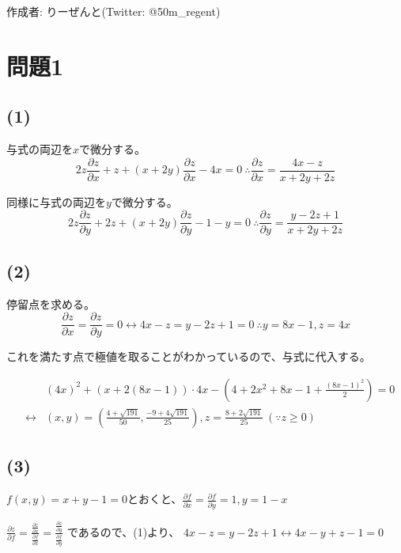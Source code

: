 \documentclass[]{jsarticle}
\begin{document}
作成者: りーぜんと(Twitter: @50m\_regent)
\section*{問題1}
    \subsection*{(1)}
        与式の両辺を$x$で微分する。
        \begin{equation*}
            2z\frac{\partial z}{\partial x} + z + (x + 2y)\frac{\partial z}{\partial x} - 4x = 0 \ \therefore \frac{\partial z}{\partial x} = \frac{4x - z}{x + 2y + 2z}
        \end{equation*}

        同様に与式の両辺を$y$で微分する。
        \begin{equation*}
            2z\frac{\partial z}{\partial y} + 2z + (x + 2y)\frac{\partial z}{\partial y} - 1 - y = 0 \ \therefore \frac{\partial z}{\partial y} = \frac{y - 2z + 1}{x + 2y + 2z}
        \end{equation*}
    \subsection*{(2)}
        停留点を求める。
        \begin{equation*}
            \frac{\partial z}{\partial x} = \frac{\partial z}{\partial y} = 0 \leftrightarrow 4x - z = y - 2z + 1 = 0 \ \therefore y = 8x - 1, z = 4x
        \end{equation*}

        これを満たす点で極値を取ることがわかっているので、与式に代入する。

        \begin{eqnarray}
            &&(4x)^2 + (x + 2(8x - 1))\cdot 4x - (4 + 2x^2+ 8x - 1 + \frac{(8x - 1)^2}{2}) = 0 \nonumber \\
            &\leftrightarrow& (x, y) = \left(\frac{4 + \sqrt{191}}{50}, \frac{-9 + 4\sqrt{191}}{25}\right), z = \frac{8 + 2\sqrt{191}}{25} \ (\because z \geq 0) \nonumber
        \end{eqnarray}
    \subsection*{(3)}
        $f(x,y) = x + y - 1 = 0$とおくと、$\displaystyle\frac{\partial f}{\partial x} = \frac{\partial f}{\partial y} = 1, y = 1 - x$

        $\displaystyle\frac{\partial z}{\partial f} = \frac{\displaystyle\frac{\partial z}{\partial x}}{\displaystyle\frac{\partial f}{\partial x}} = \frac{\displaystyle\frac{\partial z}{\partial y}}{\displaystyle\frac{\partial f}{\partial y}}$
        であるので、(1)より、
        $4x - z = y - 2z + 1 \leftrightarrow 4x - y + z - 1 = 0$
\end{document}
